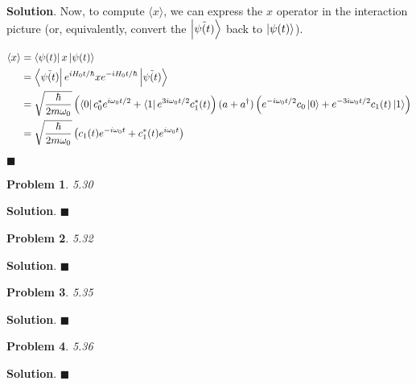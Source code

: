 \documentclass[12pt]{article}
\newtheorem{p}{Problem}
\theoremstyle{definition}
\newenvironment{s}{%
        \begin{trivlist} \item \textbf{Solution}. }{%
            \hspace*{\fill} $\blacksquare$\end{trivlist}}%
\begin{document}
{\begin{s}
Now, to compute $\langle x \rangle$, we can express the $x$ operator in the interaction picture (or, equivalently, convert the $\ket{\tilde{\psi(t)}}$ back to $\ket{\psi(t)}$).

\begin{align*}
\langle x \rangle &= \bra{\psi(t)} x \ket{\psi(t)} \\
&= \bra{\tilde{\psi(t)}}e^{iH_{0}t/\hbar} x e^{-iH_{0}t/\hbar}\ket{\tilde{\psi(t)}}\\
&= \sqrt{\frac{\hbar}{2m\omega_{0}}}\left(\bra{0}c_{0}^{*}e^{i\omega_{0}t/2} + \bra{1}e^{3i\omega_{0}t/2}c_{1}^{*}(t)\right)(a+a^{\dagger})\left(e^{-i\omega_{0}t/2}c_{0}\ket{0} + e^{-3i\omega_{0}t/2}c_{1}(t)\ket{1}\right)\\
&= \sqrt{\frac{\hbar}{2m\omega_{0}}}\left(c_{1}(t)e^{-i\omega_{0}t} + c_{1}^{*}(t)e^{i\omega_{0}t}\right)
\end{align*}

\end{s}

\begin{p}
5.30
\end{p}

\begin{s}
\end{s}

\begin{p}
5.32
\end{p}

\begin{s}
\end{s}

\begin{p}
5.35
\end{p}

\begin{s}
\end{s}

\begin{p}
5.36
\end{p}

\begin{s}
\end{s}
\end{document}
